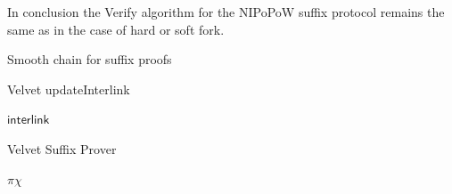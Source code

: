 In conclusion the Verify algorithm for the NIPoPoW suffix protocol remains the same as in the case of hard or soft fork.

\begin{algorithm}[H]
	\caption{\label{alg:smooth_chain_suffix}Smooth chain for suffix proofs}
	\begin{algorithmic}[1]
						\EndIf
				\EndWhile
				\State{}
			\EndFunction
	\end{algorithmic}
	\vspace{4mm}
	\begin{algorithmic}[1]
					\State\Return{$\true$}
				\EndIf
							\State\Return{$\false$}
						\EndIf
				\EndFor
				\State\Return{$\true$}
			\EndFunction
	\end{algorithmic}
	\vspace{4mm}
	\begin{algorithmic}[1]
							\State\Return{$\false$}
						\EndIf
							\State\Return{$\false$}
						\EndIf
				\EndWhile
				\State{}
			\EndFunction
	\end{algorithmic}
\end{algorithm}

\begin{algorithm}[h!]
		\caption{\label{alg:updateInterlink}Velvet updateInterlink}
		\begin{algorithmic}[1]
						\EndFor
						\State\Return$\textsf{interlink}$
				\EndFunction
		\end{algorithmic}
\end{algorithm}

\begin{algorithm}[h!]
		\caption{\label{alg:velvet_suffix_prover}Velvet Suffix Prover}
		\begin{algorithmic}
						\Let{\pi}{\pi \cup \alpha}
					\EndFor
					\State\Return$\pi\chi$
				\EndFunction
		\end{algorithmic}
\end{algorithm}
